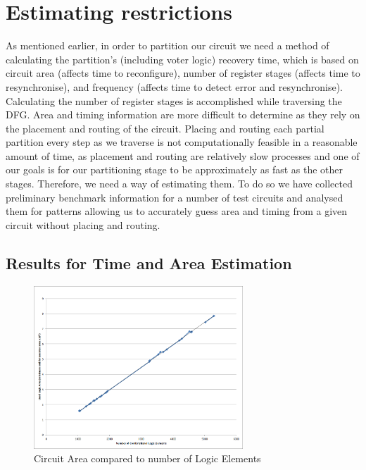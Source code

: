 \documentclass[12pt,final,oneside]{memoir} %
\begin{document}
\section{Estimating restrictions}
As mentioned earlier, in order to partition our circuit we need a method of calculating the partition's (including voter logic) recovery time, which is based on circuit area (affects time to reconfigure), number of register stages (affects time to resynchronise), and frequency (affects time to detect error and resynchronise). Calculating the number of register stages is accomplished while traversing the \ac{DFG}.
Area and timing information are more difficult to determine as they rely on the placement and routing of the circuit. Placing and routing each partial partition every step as we traverse is not computationally feasible in a reasonable amount of time, as placement and routing are relatively slow processes and one of our goals is for our partitioning stage to be approximately as fast as the other stages. Therefore, we need a way of estimating them. To do so we have collected preliminary benchmark information for a number of test circuits and analysed them for patterns allowing us to accurately guess area and timing from a given circuit without placing and routing.

\subsection{Results for Time and Area Estimation}
\begin{figure}
    \begin{center}
        \includegraphics[width=0.7\textwidth]{images/area-v-elements.png}
        \caption{Circuit Area compared to number of Logic Elements}
        \label{AreaVElements}
    \end{center}
\end{figure}
\end{document}
